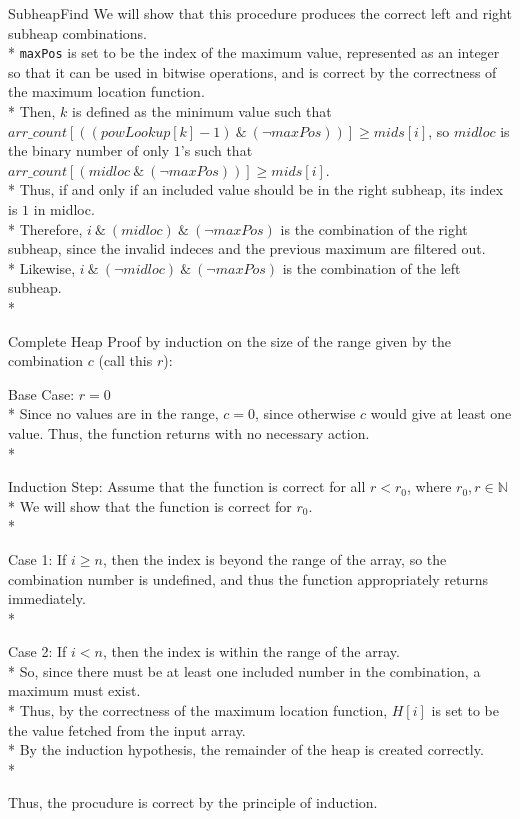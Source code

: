 \documentclass[letterpaper, reqno, 11pt]{article}
\newcommand{\NN}{\mathbb{N}}
\begin{document}
\begin{description}
	\pagebreak
	\item{SubheapFind}
	We will show that this procedure produces the correct left and right subheap combinations.\\*
	\verb|maxPos| is set to be the index of the maximum value, represented as an integer so that
	it can be used in bitwise operations, and is correct by the correctness of the maximum location
	function.\\*
	Then, $k$ is defined as the minimum value such that
	$arr\_count[((powLookup[k]-1)\ \&\ (\neg maxPos))]\geq mids[i]$,
	so $midloc$ is the binary number of only $1$'s such that
	$arr\_count[(midloc\ \&\ (\neg maxPos))]\geq mids[i]$.\\*
	Thus, if and only if an included value should be in the right subheap, its index is $1$ in midloc.\\*
	Therefore, $i\ \&\ (midloc)\ \&\ (\neg maxPos)$ is the combination of the right subheap, since the
	invalid indeces and the previous maximum are filtered out.\\*
	Likewise, $i\ \&\ (\neg midloc)\ \&\ (\neg maxPos)$ is the combination of the left subheap.\\*

	\item{Complete Heap}
	Proof by induction on the size of the range given by the combination $c$ (call this $r$):
	\begin{description}
		\item{Base Case:} $r=0$\\*
		Since no values are in the range, $c=0$, since otherwise $c$ would give at least one value.
		Thus, the function returns with no necessary action.\\*
		\item{Induction Step:} Assume that the function is correct for all $r<r_0$, where $r_0,r\in\NN$\\*
		We will show that the function is correct for $r_0$.\\*
		\begin{description}
			\item{Case 1:} If $i\geq n$, then the index is beyond the range of the array,
			so the combination number is undefined,
			and thus the function appropriately returns immediately.\\*
			\item{Case 2:} If $i<n$, then the index is within the range of the array.\\*
			So, since there must be at least one included number in the combination, a maximum
			must exist.\\*
			Thus, by the correctness of the maximum location function, $H[i]$ is set to be the value
			fetched from the input array.\\*
			By the induction hypothesis, the remainder of the heap is created correctly.\\*
		\end{description}
	\end{description}
	Thus, the procudure is correct by the principle of induction.


\end{description}
\end{document}
